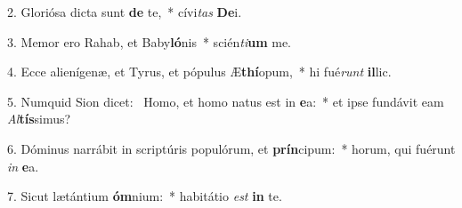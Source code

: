 2. Gloriósa dicta sunt \textbf{de} te,~*  cívi\textit{tas} \textbf{De}i.\

3. Memor ero Rahab, et Baby\textbf{ló}nis~*  scién\textit{ti}\textbf{um} me.\

4. Ecce alienígenæ, et Tyrus, et pópulus Æ\textbf{thí}opum,~*  hi fué\textit{runt} \textbf{il}lic.\

5. Numquid Sion dicet: \dag\  Homo, et homo natus est in \textbf{e}a:~*  et ipse fundávit eam \textit{Al}\textbf{tís}simus?\

6. Dóminus narrábit in scriptúris populórum, et \textbf{prín}cipum:~*  horum, qui fuérunt \textit{in} \textbf{e}a.\

7. Sicut lætántium \textbf{óm}nium:~*  habitátio \textit{est} \textbf{in} te.\

